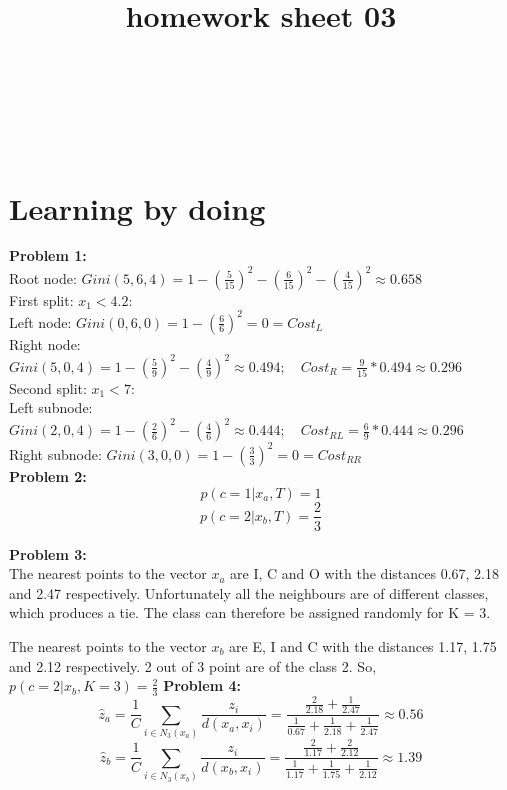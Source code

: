 \documentclass{article}
\title{homework sheet 03}
\author{
\name{Denys Sobchyshak}\\
\imat{03636581}\\
\email{denys.sobchyshak@gmail.com}
\And
\name{Sergey Zakharov} \\
\imat{03636642}\\
\email{ga39pad@mytum.de}
}
\begin{document}
\maketitle

\section{Learning by doing}

\textbf{Problem 1:}\\

Root node: $ Gini(5,6,4) = 1 - (\frac{5}{15})^2 - (\frac{6}{15})^2 - (\frac{4}{15})^2 \approx 0.658 $ \\

First split: $x_1 < 4.2$:\\

Left node: $Gini(0,6,0) = 1 - (\frac{6}{6})^2 = 0 = Cost_L $\\
Right node: $Gini(5,0,4) = 1 - (\frac{5}{9})^2 - (\frac{4}{9})^2 \approx 0.494; \quad  Cost_{R} = \frac{9}{15} * 0.494 \approx 0.296 $\\

Second split: $x_1 < 7$:\\

Left subnode: $Gini(2,0,4) = 1 - (\frac{2}{6})^2 - (\frac{4}{6})^2 \approx 0.444; \quad Cost_{RL} = \frac{6}{9} * 0.444 \approx 0.296 $\\
Right subnode: $Gini(3,0,0) = 1 - (\frac{3}{3})^2 = 0 = Cost_{RR} $\\

\textbf{Problem 2:}\\

\[ p(c = 1 | x_a, T) = 1\]
\[ p(c = 2 | x_b, T) = \frac{2}{3}\]

\textbf{Problem 3:}\\

The nearest points to the vector $ x_a $ are I, C and O with the distances 0.67, 2.18 and 2.47 respectively. Unfortunately all the neighbours are of different classes, which produces a tie. The class can therefore be assigned randomly for K = 3.

The nearest points to the vector $ x_b $ are E, I and C with the distances 1.17, 1.75 and 2.12 respectively. 2 out of 3 point are of the class 2. So, $ p(c = 2 | x_b, K = 3) = \frac{2}{3} $
\newpage
\textbf{Problem 4:}\\

\[ \hat{z}_a = \frac{1}{C}\sum_{i \in N_3(x_a)} { \frac{z_i}{d(x_a,x_i)}} = \frac{\frac{2}{2.18} + \frac{1}{2.47}}{\frac{1}{0.67} + \frac{1}{2.18} + \frac{1}{2.47}} \approx 0.56   \]
\[ \hat{z}_b = \frac{1}{C}\sum_{i \in N_3(x_b)} { \frac{z_i}{d(x_b,x_i)}} = \frac{\frac{2}{1.17} + \frac{2}{2.12}}{\frac{1}{1.17} + \frac{1}{1.75} + \frac{1}{2.12}} \approx 1.39 \]
\end{document}
